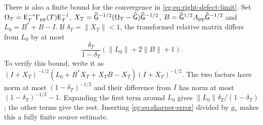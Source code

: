 There is also a finite bound for the convergence in
\eqref{eg:eq:right-defect-limit}. Set
$\Omega_T=\mathsf E_T^{-*}\Gamma_{\rm pp}(T)\mathsf E_T^{-1}$,
$X_T=\widehat{\mathsf G}^{-1/2}(\Omega_T-\widehat{\mathsf G})\widehat{\mathsf G}^{-1/2}$,
$B=\widehat{\mathsf G}^{1/2}A_{\rm pp}\widehat{\mathsf G}^{-1/2}$ and
$L_0=B^*+B-I$. If $\delta_T=\|X_T\|<1$, the transformed relative
matrix differs from $L_0$ by at most
\[
 \frac{\delta_T}{1-\delta_T}
                     (\|L_0\|+2\|B\|+1).
 \tag{EG51}\label{eg:eq:defect-error}
\]
To verify this bound, write it as
$(I+X_T)^{-1/2}(L_0+B^*X_T+X_TB-X_T)(I+X_T)^{-1/2}$.
The two factors have norm at most $(1-\delta_T)^{-1/2}$ and their
difference from $I$ has norm at most $(1-\delta_T)^{-1/2}-1$.
Expanding the first term around $L_0$ gives
$\|L_0\|\delta_T/(1-\delta_T)$; the other terms give the rest.
Inserting \eqref{eg:eq:sharper-error} divided by $g_*$ makes this a
fully finite source estimate.

